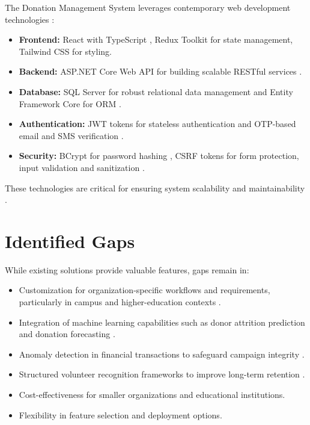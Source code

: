 The Donation Management System leverages contemporary web development technologies \cite{jones2023modern}:
\begin{itemize}
    \item \textbf{Frontend:} React with TypeScript \cite{freeman2021react}, Redux Toolkit for state management, Tailwind CSS for styling.
    \item \textbf{Backend:} ASP.NET Core Web API for building scalable RESTful services \cite{lock2021aspnet}.
    \item \textbf{Database:} SQL Server for robust relational data management and Entity Framework Core for ORM \cite{lerman2020efcore}.
    \item \textbf{Authentication:} JWT tokens for stateless authentication and OTP-based email and SMS verification \cite{suoranta2019otp}.
    \item \textbf{Security:} BCrypt for password hashing \cite{provos1999bcrypt}, CSRF tokens for form protection, input validation and sanitization \cite{owasp2021top10}.
\end{itemize}
These technologies are critical for ensuring system scalability and maintainability \cite{smith2020tech}.

\section{Identified Gaps}

While existing solutions provide valuable features, gaps remain in:
\begin{itemize}
    \item Customization for organization-specific workflows and requirements, particularly in campus and higher-education contexts \cite{kalinda2022university}.
    \item Integration of machine learning capabilities such as donor attrition prediction and donation forecasting \cite{chen2022machine, gupta2020donor}.
    \item Anomaly detection in financial transactions to safeguard campaign integrity \cite{ahmed2021anomaly}.
    \item Structured volunteer recognition frameworks to improve long-term retention \cite{rathore2021volunteer}.
    \item Cost-effectiveness for smaller organizations and educational institutions.
    \item Flexibility in feature selection and deployment options.
\end{itemize}

